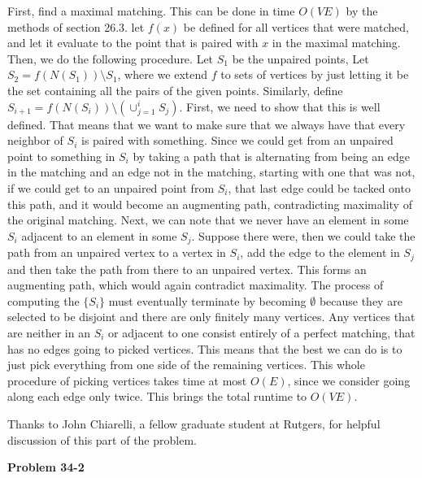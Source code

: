 \documentclass{article}
\begin{document}
\begin{enumerate}[a)]
First, find a maximal matching. This can be done in time $O(VE)$ by the methods of section 26.3. let $f(x)$ be defined for all vertices that were matched, and let it evaluate to the point that is paired with $x$ in the maximal matching. Then, we do the following procedure. Let $S_1$ be the unpaired points, Let $S_2 = f(N(S_1))\setminus S_1$, where we extend $f$ to sets of vertices by just letting it be the set containing all the pairs of the given points. Similarly, define $S_{i+1} = f(N(S_i))\setminus\left(\cup_{j=1}^{i} S_j\right)$. First, we need to show that this is well defined. That means that we want to make sure that we always have that every neighbor of $S_i$ is paired with something. Since we could get from an unpaired point to something in $S_i$ by taking a path that is alternating from being an edge in the matching and an edge not in the matching, starting with one that was not, if we could get to an unpaired point from $S_i$, that last edge could be tacked onto this path, and it would become an augmenting path, contradicting maximality of the original matching. Next, we can note that we never have an element in some $S_i$ adjacent to an element in some $S_j$. Suppose there were, then we could take the path from an unpaired vertex to a vertex in $S_i$, add the edge to the element in $S_j$ and then take the path from there to an unpaired vertex. This forms an augmenting path, which would again contradict maximality. The process of computing the $\{S_i\}$ must eventually terminate by becoming $\emptyset$ because they are selected to be disjoint and there are only finitely many vertices. Any vertices that are neither in an $S_i$ or adjacent to one consist entirely of a perfect matching, that has no edges going to picked vertices. This means that the best we can do is to just pick everything from one side of the remaining vertices. This whole procedure of picking vertices takes time at most $O(E)$, since we consider going along each edge only twice. This brings the total runtime to $O(VE)$. 

Thanks to John Chiarelli, a fellow graduate student at Rutgers, for helpful discussion of this part of the problem.

\end{enumerate}

\noindent\textbf{Problem 34-2}\\
\end{document}
